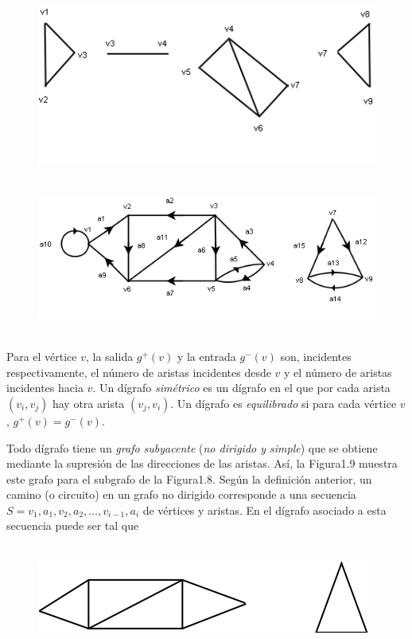 \documentclass[10pt,a5paper]{book}
\begin{document}
\begin{figure}[H]
  \centering
  \caption{ }
\hrulefill{}\\
  \includegraphics[scale=0.5]{Figura1_7.png}
\end{figure}
\begin{figure}[H]
  \centering
  \caption{ }
  \hrulefill{}\\
  \includegraphics[scale=0.5]{Figura1_8.png}
\end{figure}
\hrulefill{}\\

Para el vértice $v$, la salida $g^{+}(v)$ y la entrada $g^{-}(v)$ son, incidentes respectivamente, el número de aristas incidentes desde $v$ y el número de aristas incidentes hacia $v$. Un dígrafo \emph{simétrico} es un dígrafo en el que por cada arista $(v_i,v_j)$ hay otra arista $(v_j,v_i)$. Un dígrafo es \emph{equilibrado} si para cada vértice $v$, $g^{+}(v) = g^{-}(v)$.

Todo dígrafo tiene un \emph{grafo subyacente} (\emph{no dirigido y simple}) que se obtiene mediante la supresión de las direcciones de las aristas. Así, la Figura1.9 muestra este grafo para el
 subgrafo de la Figura1.8. Según la definición anterior, un camino (o circuito) en un grafo no dirigido corresponde a una secuencia $S = v_1,a_1,v_2,a_2, \ldots,v_{i-1},a_i$ de vértices y aristas. En el dígrafo asociado a esta secuencia puede ser tal que\\

\begin{figure}[H]
  \centering
  \caption{ }
  \hrulefill{}\\
  \includegraphics[scale=0.5]{Figura1_9.png}
\end{figure}
\hrulefill{}\\
\end{document}
